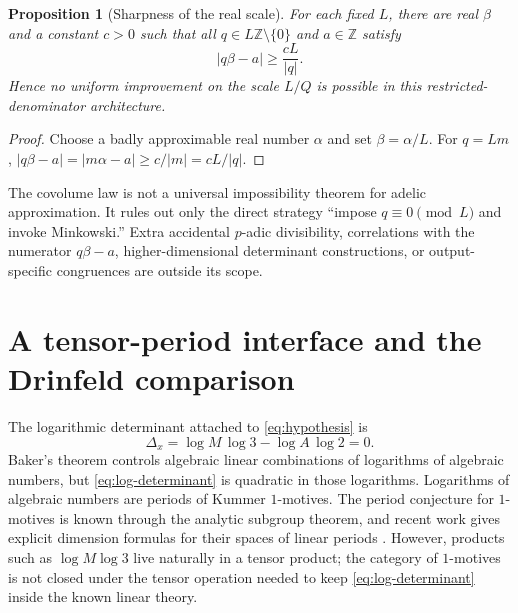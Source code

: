 \documentclass[11pt]{article}
\newtheorem{proposition}[theorem]{Proposition}
\theoremstyle{definition}
\newcommand{\Z}{\mathbb Z}
\begin{document}
\begin{proposition}[Sharpness of the real scale]
\label{prop:covolume-sharp}
For each fixed $L$, there are real $\beta$ and a constant $c>0$ such that all
$q\in L\Z\setminus\{0\}$ and $a\in\Z$ satisfy
\begin{equation}
 |q\beta-a|\ge \frac{cL}{|q|}.
 \label{eq:sharp-restricted-dirichlet}
\end{equation}
Hence no uniform improvement on the scale $L/Q$ is possible in this
restricted-denominator architecture.
\end{proposition}

\begin{proof}
Choose a badly approximable real number $\alpha$ and set $\beta=\alpha/L$.
For $q=Lm$,
$|q\beta-a|=|m\alpha-a|\ge c/|m|=cL/|q|$.
\end{proof}

\begin{cautionbox}
The covolume law is not a universal impossibility theorem for adelic
approximation.  It rules out only the direct strategy ``impose $q\equiv0
\pmod L$ and invoke Minkowski.''  Extra accidental $p$-adic divisibility,
correlations with the numerator $q\beta-a$, higher-dimensional determinant
constructions, or output-specific congruences are outside its scope.
\end{cautionbox}

\section{A tensor-period interface and the Drinfeld comparison}
\label{sec:motivic}

The logarithmic determinant attached to \eqref{eq:hypothesis} is
\begin{equation}
 \Delta_x=\log M\,\log3-\log A\,\log2=0.
 \label{eq:log-determinant}
\end{equation}
Baker's theorem controls algebraic linear combinations of logarithms of
algebraic numbers, but \eqref{eq:log-determinant} is quadratic in those
logarithms.  Logarithms of algebraic numbers are periods of Kummer
$1$-motives.  The period conjecture for $1$-motives is known through the
analytic subgroup theorem, and recent work gives explicit dimension formulas
for their spaces of linear periods \cite{HuberWustholz2022,HuberKalck2025}.
However, products such as $\log M\log3$ live naturally in a tensor product;
the category of $1$-motives is not closed under the tensor operation needed
to keep \eqref{eq:log-determinant} inside the known linear theory.
\end{document}
